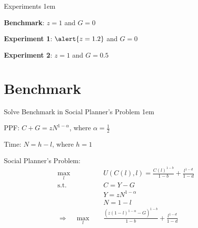 \documentclass[11pt,aspectratio=43]{beamer}
\let\olditemize=\itemize
\let\endolditemize=\enditemize
\renewenvironment{itemize}{\olditemize \itemsep1em}{\endolditemize}
\let\oldenumerate=\enumerate
\let\endoldenumerate=\endenumerate
\renewenvironment{enumerate}{\oldenumerate \itemsep1em}{ \endoldenumerate}
\theoremstyle{definition}
\begin{document}
\begin{frame}{Experiments}
\label{slide:Experiments}
    \begin{enumerate}
        \item \textbf{Benchmark}: $ z = 1 $ and $ G = 0 $
        \item \textbf{Experiment 1}: $ \alert{z = 1.2} $ and $ G = 0 $
        \item \textbf{Experiment 2}: $ z = 1 $ and $ G = 0.5 $
    \end{enumerate}
\end{frame}

\section{Benchmark}
\label{sec:Benchmark}

\begin{frame}{Solve Benchmark in Social Planner's Problem}
\label{slide:Solve_Benchmark_in_Social_Planner_s_Problem}
    \begin{itemize}
        \item PPF: $ C + G = z N^{1-\alpha} $, where $ \alpha = \frac{1}{2} $
        \item Time: $ N = h - l $, where $ h = 1 $
        \item Social Planner's Problem:
        \begin{equation}
        \label{eq:SPP_Benchmark}
            \begin{split}
                \max_{l} \quad
                    & U( C( l ), l ) = \frac{C( l )^{1-b}}{1-b} + \frac{l^{1-d}}{1-d}
                \\
                \text{s.t.} \quad
                    & C = Y - G
                \\
                    & Y = z N^{1-\alpha}
                \\
                    & N = 1 - l
                \\
                \Rightarrow \quad \max_{l} \quad
                    & \frac{(z ( 1-l )^{1-\alpha} - G)^{1-b}}{1-b} + \frac{l^{1-d}}{1-d}
                \\
            \end{split}
        \end{equation}
    \end{itemize}
\end{frame}
\end{document}

